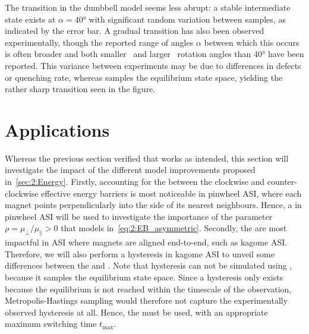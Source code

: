 
The transition in the dumbbell model seems less abrupt: a stable intermediate state exists at $\alpha=\ang{40}$ with significant random variation between samples, as indicated by the error bar. %
A gradual transition has also been observed experimentally, though the reported range of angles $\alpha$ between which this occurs is often broader and both smaller~\cite{ProbingAFM-PMtransition} and larger~\cite{AFM-FM-transition-Pinwheel} rotation angles than $\ang{40}$ have been reported.
This variance between experiments may be due to differences in defects or quenching rate, whereas  samples the equilibrium state space, yielding the rather sharp transition seen in the figure.

\newpage
\section{Applications}
Whereas the previous section verified that \hotspice works as intended, this section will investigate the impact of the different model improvements proposed in~\cref{sec:2:Energy}.
Firstly, accounting for the  between the clockwise and counter-clockwise effective energy barriers is most noticeable in pinwheel ASI, where each magnet points perpendicularly into the side of its nearest neighbours.
Hence, a  in pinwheel ASI will be used to investigate the importance of the parameter $\rho = \mu_\perp/\mu_\parallel > 0$ that models  in~\cref{eq:2:EB_asymmetric}.
Secondly, the  are most impactful in ASI where magnets are aligned end-to-end, such as kagome ASI.
Therefore, we will also perform a hysteresis in kagome ASI to unveil some differences between the  and .
Note that hysteresis can not be simulated using , because it samples the equilibrium state space. %
Since a hysteresis only exists because the equilibrium is not reached within the timescale of the observation, Metropolis-Hastings sampling would therefore not capture the experimentally observed hysteresis at all.
Hence, the  must be used, with an appropriate maximum switching time $t_\mathrm{max}$. 

